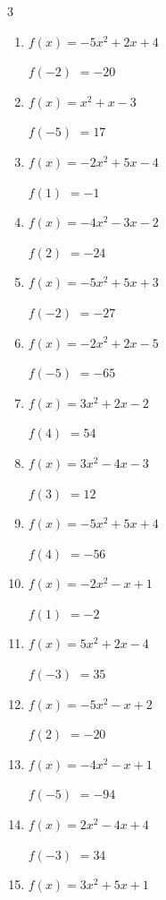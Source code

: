 \begin{multicols}{3}
\begin{enumerate}
$f(-4)$
        $= -61$

\columnbreak %

  \item $f(x)=-5x^{2}+2x+4$

$f(-2)$
        $= -20$

  \item $f(x)=x^{2}+x-3$

$f(-5)$
        $= 17$

  \item $f(x)=-2x^{2}+5x-4$

$f(1)$
        $= -1$

  \item $f(x)=-4x^{2}-3x-2$

$f(2)$
        $= -24$

  \item $f(x)=-5x^{2}+5x+3$

$f(-2)$
        $= -27$

  \item $f(x)=-2x^{2}+2x-5$

$f(-5)$
        $= -65$

  \item $f(x)=3x^{2}+2x-2$

$f(4)$
        $= 54$

  \item $f(x)=3x^{2}-4x-3$

$f(3)$
        $= 12$

  \item $f(x)=-5x^{2}+5x+4$

$f(4)$
        $= -56$

  \item $f(x)=-2x^{2}-x+1$

$f(1)$
        $= -2$

  \item $f(x)=5x^{2}+2x-4$

$f(-3)$
        $= 35$

  \item $f(x)=-5x^{2}-x+2$

$f(2)$
        $= -20$

  \item $f(x)=-4x^{2}-x+1$

$f(-5)$
        $= -94$

  \item $f(x)=2x^{2}-4x+4$

$f(-3)$
        $= 34$

  \item $f(x)=3x^{2}+5x+1$


\end{enumerate}
\end{multicols}

